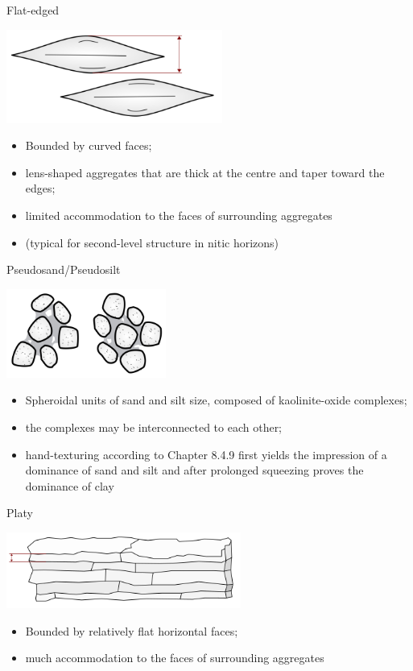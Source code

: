 \documentclass[
  letterpaper,
  DIV=11,
  numbers=noendperiod]{scrreprt}
\providecommand{\tightlist}{%
  \setlength{\itemsep}{0pt}\setlength{\parskip}{0pt}}\usepackage{longtable,booktabs,array}
\begin{document}
Flat-edged

\includegraphics{./table_8-41-09.png}

\begin{itemize}
\tightlist
\item
  Bounded by curved faces;
\item
  lens-shaped aggregates that are thick at the centre and taper toward
  the edges;
\item
  limited accommodation to the faces of surrounding aggregates
\item
  (typical for second-level structure in nitic horizons)
\end{itemize}

Pseudosand/Pseudosilt

\includegraphics{./table_8-41-10.png}

\begin{itemize}
\tightlist
\item
  Spheroidal units of sand and silt size, composed of kaolinite-oxide
  complexes;
\item
  the complexes may be interconnected to each other;
\item
  hand-texturing according to Chapter 8.4.9 first yields the impression
  of a dominance of sand and silt and after prolonged squeezing proves
  the dominance of clay
\end{itemize}

Platy

\includegraphics{./table_8-41-11.png}

\begin{itemize}
\tightlist
\item
  Bounded by relatively flat horizontal faces;
\item
  much accommodation to the faces of surrounding aggregates
\end{itemize}
\end{document}
